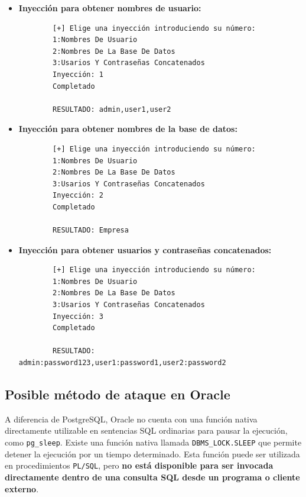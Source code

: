 \documentclass[a4paper,12pt]{article}
\begin{document}
\begin{itemize}
    \item \textbf{Inyección para obtener nombres de usuario:}  
    \begin{lstlisting}
        [+] Elige una inyección introduciendo su número:
        1:Nombres De Usuario
        2:Nombres De La Base De Datos
        3:Usarios Y Contraseñas Concatenados
        Inyección: 1
        Completado
        
        RESULTADO: admin,user1,user2        
    \end{lstlisting}

    \item \textbf{Inyección para obtener nombres de la base de datos:}  
    \begin{lstlisting}
        [+] Elige una inyección introduciendo su número:
        1:Nombres De Usuario
        2:Nombres De La Base De Datos
        3:Usarios Y Contraseñas Concatenados
        Inyección: 2
        Completado
        
        RESULTADO: Empresa        
    \end{lstlisting}

    \item \textbf{Inyección para obtener usuarios y contraseñas concatenados:}  
    \begin{lstlisting}
        [+] Elige una inyección introduciendo su número:
        1:Nombres De Usuario
        2:Nombres De La Base De Datos
        3:Usarios Y Contraseñas Concatenados
        Inyección: 3
        Completado
        
        RESULTADO: admin:password123,user1:password1,user2:password2        
    \end{lstlisting}
\end{itemize}


\subsection{Posible método de ataque en Oracle}

A diferencia de PostgreSQL, Oracle no cuenta con una función nativa directamente utilizable en sentencias SQL ordinarias para pausar la ejecución, como \texttt{pg\_sleep}. Existe una función nativa llamada \texttt{DBMS\_LOCK.SLEEP} que permite detener la ejecución por un tiempo determinado. Esta función puede ser utilizada en procedimientos \texttt{PL/SQL}, pero \textbf{no está disponible para ser invocada directamente dentro de una consulta SQL desde un programa o cliente externo}. 
\end{document}
